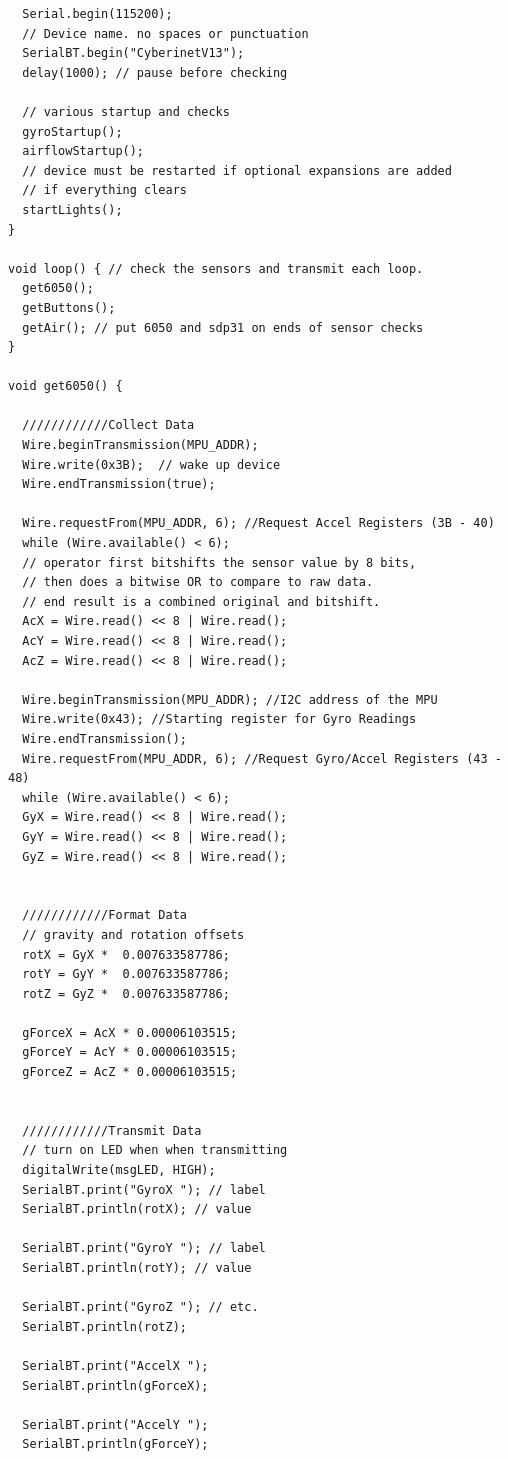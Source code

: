 \begin{verbatim}
  Serial.begin(115200);
  // Device name. no spaces or punctuation
  SerialBT.begin("CyberinetV13"); 
  delay(1000); // pause before checking
  
  // various startup and checks
  gyroStartup();
  airflowStartup();
  // device must be restarted if optional expansions are added
  // if everything clears
  startLights();
}

void loop() { // check the sensors and transmit each loop.
  get6050();
  getButtons();
  getAir(); // put 6050 and sdp31 on ends of sensor checks
}

void get6050() {

  ////////////Collect Data
  Wire.beginTransmission(MPU_ADDR);
  Wire.write(0x3B);  // wake up device
  Wire.endTransmission(true);

  Wire.requestFrom(MPU_ADDR, 6); //Request Accel Registers (3B - 40)
  while (Wire.available() < 6);
  // operator first bitshifts the sensor value by 8 bits,
  // then does a bitwise OR to compare to raw data.
  // end result is a combined original and bitshift.
  AcX = Wire.read() << 8 | Wire.read(); 
  AcY = Wire.read() << 8 | Wire.read(); 
  AcZ = Wire.read() << 8 | Wire.read(); 

  Wire.beginTransmission(MPU_ADDR); //I2C address of the MPU
  Wire.write(0x43); //Starting register for Gyro Readings
  Wire.endTransmission();
  Wire.requestFrom(MPU_ADDR, 6); //Request Gyro/Accel Registers (43 - 48)
  while (Wire.available() < 6);
  GyX = Wire.read() << 8 | Wire.read();
  GyY = Wire.read() << 8 | Wire.read();
  GyZ = Wire.read() << 8 | Wire.read();


  ////////////Format Data
  // gravity and rotation offsets
  rotX = GyX *  0.007633587786; 
  rotY = GyY *  0.007633587786;
  rotZ = GyZ *  0.007633587786;

  gForceX = AcX * 0.00006103515;
  gForceY = AcY * 0.00006103515;
  gForceZ = AcZ * 0.00006103515;


  ////////////Transmit Data
  // turn on LED when when transmitting
  digitalWrite(msgLED, HIGH); 
  SerialBT.print("GyroX "); // label
  SerialBT.println(rotX); // value

  SerialBT.print("GyroY "); // label
  SerialBT.println(rotY); // value

  SerialBT.print("GyroZ "); // etc.
  SerialBT.println(rotZ);

  SerialBT.print("AccelX ");
  SerialBT.println(gForceX);

  SerialBT.print("AccelY ");
  SerialBT.println(gForceY);


\end{verbatim}
